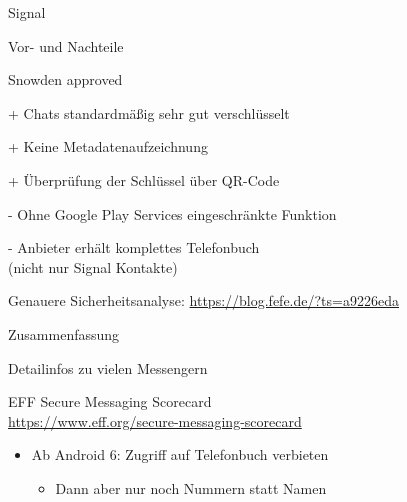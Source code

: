 \begin{frame}{Signal}
\begin{blex}{Vor- und Nachteile}
\item \glqq Snowden approved\grqq
\item[+] Chats standardmäßig sehr gut verschlüsselt
\item[+] Keine Metadatenaufzeichnung
\item[+] Überprüfung der Schlüssel über QR-Code
\item[-] Ohne Google Play Services eingeschränkte Funktion 
\item[-] Anbieter erhält komplettes Telefonbuch\\ (nicht nur Signal Kontakte)
\end{blex}
Genauere Sicherheitsanalyse: {\small\url{https://blog.fefe.de/?ts=a9226eda}}
\end{frame}

\begin{frame}{Zusammenfassung}
\begin{blit}{Detailinfos zu vielen Messengern}
\item EFF Secure Messaging Scorecard\\ {\small\url{https://www.eff.org/secure-messaging-scorecard}}
\end{blit}

\begin{itemize}
\item Ab Android 6: Zugriff auf Telefonbuch verbieten
\begin{itemize}
\item Dann aber nur noch Nummern statt Namen
\end{itemize}
\end{itemize}
\end{frame}
